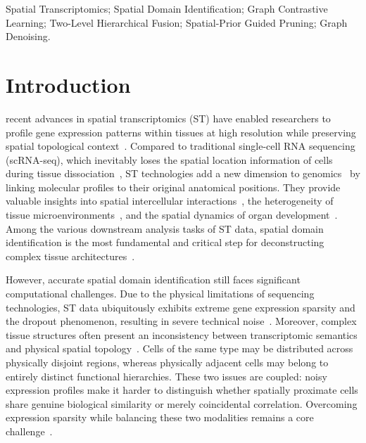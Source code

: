 \documentclass[lettersize,journal]{IEEEtran}
\begin{document}
\begin{IEEEkeywords}
Spatial Transcriptomics; Spatial Domain Identification; Graph Contrastive Learning; Two-Level Hierarchical Fusion; Spatial-Prior Guided Pruning; Graph Denoising.
\end{IEEEkeywords}

\section{Introduction}
\label{sec:introduction}

 recent advances in spatial transcriptomics (ST) have enabled researchers to profile gene expression patterns within tissues at high resolution while preserving spatial topological context~\cite{stahl2016visualization}. Compared to traditional single-cell RNA sequencing (scRNA-seq), which inevitably loses the spatial location information of cells during tissue dissociation~\cite{stuart2019comprehensive}, ST technologies add a new dimension to genomics~\cite{larsson2021spatially} by linking molecular profiles to their original anatomical positions. They provide valuable insights into spatial intercellular interactions~\cite{rao2021exploring}, the heterogeneity of tissue microenvironments~\cite{zhao2021cancer}, and the spatial dynamics of organ development~\cite{asp2019spatiotemporal}. Among the various downstream analysis tasks of ST data, spatial domain identification is the most fundamental and critical step for deconstructing complex tissue architectures~\cite{wang2024comprehensive}.

However, accurate spatial domain identification still faces significant computational challenges. Due to the physical limitations of sequencing technologies, ST data ubiquitously exhibits extreme gene expression sparsity and the dropout phenomenon, resulting in severe technical noise~\cite{qiu2020embracing}. Moreover, complex tissue structures often present an inconsistency between transcriptomic semantics and physical spatial topology~\cite{dong2022deciphering}. Cells of the same type may be distributed across physically disjoint regions, whereas physically adjacent cells may belong to entirely distinct functional hierarchies. These two issues are coupled: noisy expression profiles make it harder to distinguish whether spatially proximate cells share genuine biological similarity or merely coincidental correlation. Overcoming expression sparsity while balancing these two modalities remains a core challenge~\cite{zhao2021bayesspace}.
\end{document}
